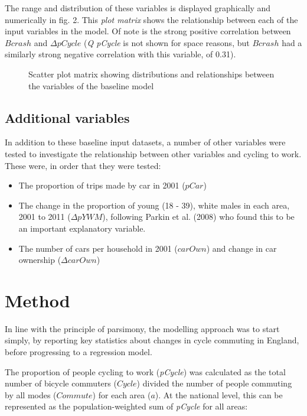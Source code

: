 The range and distribution of these variables is displayed graphically
and numerically in fig. 2. This \emph{plot matrix} shows the
relationship between each of the input variables in the model. Of note
is the strong positive correlation between $Bcrash$ and $\Delta pCycle$
(\emph{Q pCycle} is not shown for space reasons, but $Bcrash$ had a
similarly strong negative correlation with this variable, of 0.31).

\begin{figure}[htbp]
\centering
\caption{Scatter plot matrix showing distributions and relationships
between the variables of the baseline model}
\end{figure}

\subsection{Additional variables}\label{additional-variables}

In addition to these baseline input datasets, a number of other
variables were tested to investigate the relationship between other
variables and cycling to work. These were, in order that they were
tested:

\begin{itemize}
\itemsep1pt\parskip0pt
\item
  The proportion of trips made by car in 2001 ($pCar$)
\item
  The change in the proportion of young (18 - 39), white males in each
  area, 2001 to 2011 ($\Delta pYWM$), following Parkin et al. (2008) who
  found this to be an important explanatory variable.
\item
  The number of cars per household in 2001 ($carOwn$) and change in car
  ownership ($\Delta carOwn$)
\end{itemize}

\section{Method}\label{method}

In line with the principle of parsimony, the modelling approach was to
start simply, by reporting key statistics about changes in cycle
commuting in England, before progressing to a regression model.

The proportion of people cycling to work (\emph{pCycle}) was calculated
as the total number of bicycle commuters ($Cycle$) divided the number of
people commuting by all modes ($Commute$) for each area ($a$). At the
national level, this can be represented as the population-weighted sum
of \emph{pCycle} for all areas:

